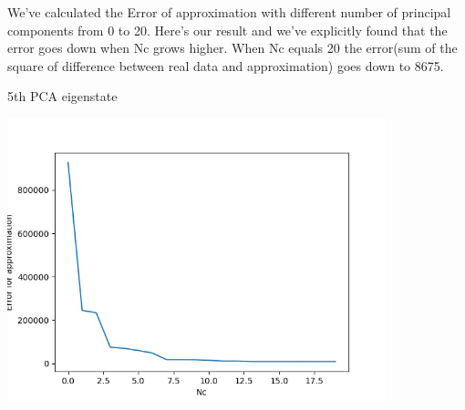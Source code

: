 \documentclass[letterpaper,12pt]{article}
\begin{document}
We've calculated the Error of approximation with different number of principal components from 0 to 20. Here's our result and we've explicitly found that the error goes down when Nc grows higher. When Nc equals 20 the error(sum of the square of difference between real data and approximation) goes down to 8675.

\begin{table}[!h]
    \centering
    \caption{5th PCA eigenstate}
    \includegraphics[width=11cm]{7-9.png}
\end{table}%
\end{document}
